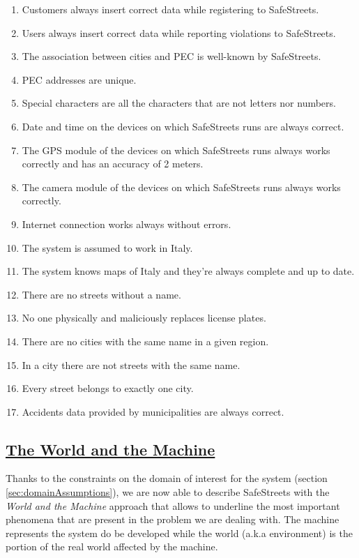 	\begin{enumerate}[label=\textbf{DA\arabic*}]
		\item \label{dom:correctRegistration} Customers always insert correct data while registering to SafeStreets.
		\item \label{dom:correctViolation} Users always insert correct data while reporting violations to SafeStreets.
		\item \label{dom:pecKnown} The association between cities and PEC is well-known by SafeStreets.
		\item \label{dom:uniquePec} PEC addresses are unique.
		\item \label{dom:specialCharacters} Special characters are all the characters that are not letters nor numbers.
		\item \label{dom:correctDateTime} Date and time on the devices on which SafeStreets runs are always correct.
		\item \label{dom:gpsAccuracy} The GPS module of the devices on which SafeStreets runs always works correctly and has an accuracy of 2 meters.
		\item \label{dom:correctCamera} The camera module of the devices on which SafeStreets runs always works correctly.
		\item \label{dom:correctInternet} Internet connection works always without errors.
		\item \label{dom:italy} The system is assumed to work in Italy.
		\item \label{dom:italyMaps} The system knows maps of Italy and they’re always complete and up to date.
		\item \label{dom:nonameStreets} There are no streets without a name.
		\item \label{dom:noMaliciousPlates} No one physically and maliciously replaces license plates.
		\item \label{dom:nosameCities} There are no cities with the same name in a given region.
		\item \label{dom:nosameStreets} In a city there are not streets with the same name.
		\item \label{dom:streetCity} Every street belongs to exactly one city.
		\item \label{dom:correctAccidents} Accidents data provided by municipalities are always correct.
	\end{enumerate} 
	
\subsection[The World and the Machine]{\hyperlink{toc}{The World and the Machine}}
	\label{sec:worldMachine}
	Thanks to the constraints on the domain of interest for the system (section \ref{sec:domainAssumptions}), we are now able to describe SafeStreets with the \textit{World and the Machine} approach that allows to underline the most important phenomena that are present in the problem we are dealing with. The machine represents the system do be developed while the world (a.k.a environment) is the portion of the real world affected by the machine.\\
	
